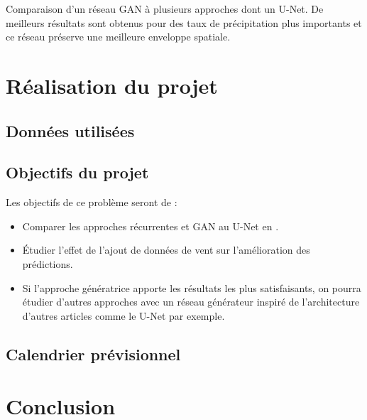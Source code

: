 \documentclass[11pt,a4paper,french]{article}
\begin{document}
Comparaison d'un réseau GAN à plusieurs approches dont un U-Net. De meilleurs résultats sont obtenus pour des taux de précipitation plus importants et ce réseau préserve une meilleure enveloppe spatiale. \cite{ravuri2021skillful}

\section{Réalisation du projet}

\subsection{Données utilisées}

\subsection{Objectifs du projet}

Les objectifs de ce problème seront de :
\begin{itemize}
    \item Comparer les approches récurrentes et GAN au U-Net en \cite{bouget:hal-03112093}.
    \item Étudier l'effet de l'ajout de données de vent sur l'amélioration des prédictions. 
    \item Si l'approche génératrice apporte les résultats les plus satisfaisants, on pourra étudier d'autres approches avec un réseau générateur inspiré de l'architecture d'autres articles comme le U-Net par exemple. 
\end{itemize}

\subsection{Calendrier prévisionnel}

\section{Conclusion}

\newpage

\printbibliography[title=Références]
\end{document}
